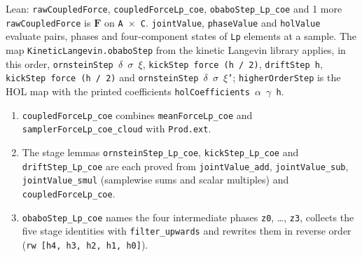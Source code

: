 \documentclass[11pt,a4paper]{report}
\begin{document}
\begin{leanbox}{Lean: \texttt{rawCoupledForce}, \texttt{coupledForceLp\_\allowbreak{}coe}, \texttt{obaboStep\_\allowbreak{}Lp\_\allowbreak{}coe} and 1 more}
\texttt{raw\allowbreak{}Coupled\allowbreak{}Force} is \(\mathbf F\) on \texttt{A \ensuremath{\times} C}. \texttt{joint\allowbreak{}Value}, \texttt{phase\allowbreak{}Value} and \texttt{hol\allowbreak{}Value} evaluate pairs, phases and four-component states of \texttt{Lp} elements at a sample. The map \texttt{Kinetic\allowbreak{}Langevin.\allowbreak{}obabo\allowbreak{}Step} from the kinetic Langevin library applies, in this order, \texttt{ornstein\allowbreak{}Step \ensuremath{\delta} \ensuremath{\sigma} \ensuremath{\xi}}, \texttt{kick\allowbreak{}Step force (h /\allowbreak{} 2)}, \texttt{drift\allowbreak{}Step h}, \texttt{kick\allowbreak{}Step force (h /\allowbreak{} 2)} and \texttt{ornstein\allowbreak{}Step \ensuremath{\delta} \ensuremath{\sigma} \ensuremath{\xi}'}; \texttt{higher\allowbreak{}Order\allowbreak{}Step} is the HOL map with the printed coefficients \texttt{hol\allowbreak{}Coefficients \ensuremath{\alpha} \ensuremath{\gamma} h}.



\begin{enumerate}


\item \texttt{coupled\allowbreak{}Force\allowbreak{}Lp\_\allowbreak{}coe} combines \texttt{mean\allowbreak{}Force\allowbreak{}Lp\_\allowbreak{}coe} and \texttt{sampler\allowbreak{}Force\allowbreak{}Lp\_\allowbreak{}coe\_\allowbreak{}cloud} with \texttt{Prod.\allowbreak{}ext}.

\item The stage lemmas \texttt{ornstein\allowbreak{}Step\_\allowbreak{}Lp\_\allowbreak{}coe}, \texttt{kick\allowbreak{}Step\_\allowbreak{}Lp\_\allowbreak{}coe} and \texttt{drift\allowbreak{}Step\_\allowbreak{}Lp\_\allowbreak{}coe} are each proved from \texttt{joint\allowbreak{}Value\_\allowbreak{}add}, \texttt{joint\allowbreak{}Value\_\allowbreak{}sub}, \texttt{joint\allowbreak{}Value\_\allowbreak{}smul} (samplewise sums and scalar multiples) and \texttt{coupled\allowbreak{}Force\allowbreak{}Lp\_\allowbreak{}coe}.

\item \texttt{obabo\allowbreak{}Step\_\allowbreak{}Lp\_\allowbreak{}coe} names the four intermediate phases \texttt{z0}, …, \texttt{z3}, collects the five stage identities with \texttt{filter\_\allowbreak{}upwards} and rewrites them in reverse order (\texttt{rw [h4, h3, h2, h1, h0]}).


\end{enumerate}
\end{leanbox}
\end{document}
